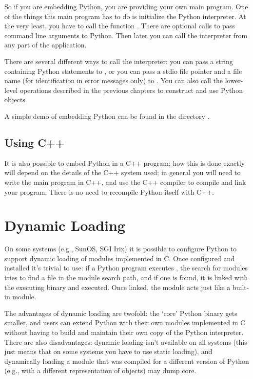 So if you are embedding Python, you are providing your own main
program.  One of the things this main program has to do is initialize
the Python interpreter.  At the very least, you have to call the
function .  There are optional calls to pass command
line arguments to Python.  Then later you can call the interpreter
from any part of the application.

There are several different ways to call the interpreter: you can pass
a string containing Python statements to , or you
can pass a stdio file pointer and a file name (for identification in
error messages only) to .  You can also call the
lower-level operations described in the previous chapters to construct
and use Python objects.

A simple demo of embedding Python can be found in the directory
.


\section{Using C++}

It is also possible to embed Python in a C++ program; how this is done
exactly will depend on the details of the C++ system used; in general
you will need to write the main program in C++, and use the C++
compiler to compile and link your program.  There is no need to
recompile Python itself with C++.


\chapter{Dynamic Loading}

On some systems (e.g., SunOS, SGI Irix) it is possible to configure
Python to support dynamic loading of modules implemented in C.  Once
configured and installed it's trivial to use: if a Python program
executes , the search for modules tries to find a
file  in the module search path, and if one is
found, it is linked with the executing binary and executed.  Once
linked, the module acts just like a built-in module.

The advantages of dynamic loading are twofold: the `core' Python
binary gets smaller, and users can extend Python with their own
modules implemented in C without having to build and maintain their
own copy of the Python interpreter.  There are also disadvantages:
dynamic loading isn't available on all systems (this just means that
on some systems you have to use static loading), and dynamically
loading a module that was compiled for a different version of Python
(e.g., with a different representation of objects) may dump core.

